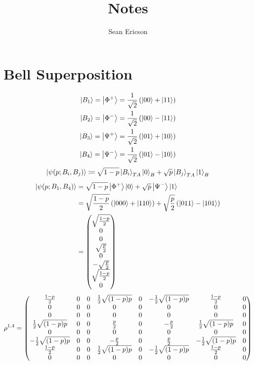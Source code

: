 \documentclass[12pt]{article}
\begin{document}
	
\title{Notes}
\author{Sean Ericson}
\maketitle

\section*{Bell Superposition}
\begin{align*}
    \ket{B_1} = \ket{\Phi^+} &= \frac{1}{\sqrt{2}}\left(\ket{00} + \ket{11}\right) \\
    \ket{B_2} = \ket{\Phi^-} &= \frac{1}{\sqrt{2}}\left(\ket{00} - \ket{11}\right) \\
    \ket{B_3} = \ket{\Psi^+} &= \frac{1}{\sqrt{2}}\left(\ket{01} + \ket{10}\right) \\
    \ket{B_4} = \ket{\Psi^-} &= \frac{1}{\sqrt{2}}\left(\ket{01} - \ket{10}\right) \\
\end{align*}
\[ \ket{\psi(p;B_i,B_j)} \coloneqq \sqrt{1-p}\ket{B_i}_{TA}\ket{0}_B + \sqrt{p}\ket{B_j}_{TA}\ket{1}_B \]
\begin{align*}
    \ket{\psi(p;B_1,B_4)} &= \sqrt{1-p}\ket{\Phi^+}\ket{0} + \sqrt{p}\ket{\Psi^-}\ket{1} \\
    &= \sqrt{\frac{1-p}{2}}\left(\ket{000} + \ket{110}\right) + \sqrt{\frac{p}{2}}\left(\ket{011} - \ket{101}\right) \\
    &= \mqty( \sqrt{\frac{1-p}{2}} \\ 0 \\ 0 \\ \sqrt{\frac{p}{2}} \\ 0 \\ -\sqrt{\frac{p}{2}} \\ \sqrt{\frac{1-p}{2}} \\ 0) 
\end{align*}
\begin{align*}
    \rho^{1,4} &= \mqty(
        \frac{1-p}{2} & 0 & 0 & \frac{1}{2} \sqrt{(1-p) p} & 0 & -\frac{1}{2} \sqrt{(1-p) p} & \frac{1-p}{2} & 0 \\
        0 & 0 & 0 & 0 & 0 & 0 & 0 & 0 \\
        0 & 0 & 0 & 0 & 0 & 0 & 0 & 0 \\
        \frac{1}{2} \sqrt{(1-p) p} & 0 & 0 & \frac{p}{2} & 0 & -\frac{p}{2} & \frac{1}{2} \sqrt{(1-p) p} & 0 \\
        0 & 0 & 0 & 0 & 0 & 0 & 0 & 0 \\
        -\frac{1}{2} \sqrt{(1-p) p} & 0 & 0 & -\frac{p}{2} & 0 & \frac{p}{2} & -\frac{1}{2} \sqrt{(1-p) p} & 0 \\
        \frac{1-p}{2} & 0 & 0 & \frac{1}{2} \sqrt{(1-p) p} & 0 & -\frac{1}{2} \sqrt{(1-p) p} & \frac{1-p}{2} & 0 \\
        0 & 0 & 0 & 0 & 0 & 0 & 0 & 0
    ) \\
\end{align*} 
\end{document}
